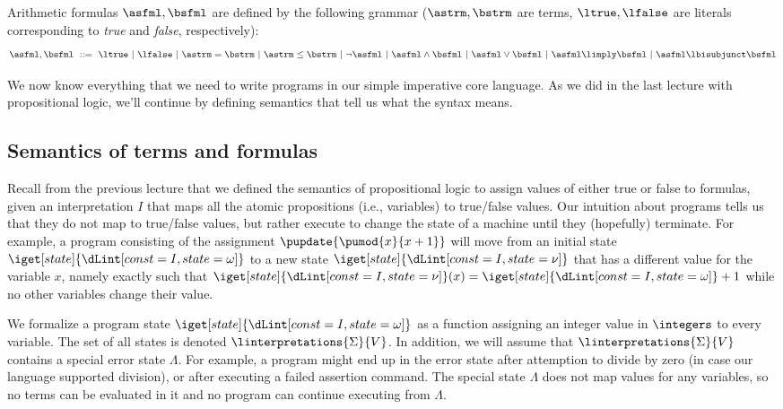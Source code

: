 \documentclass[11pt,twoside]{scrartcl}
\newcommand{\errstate}{\ensuremath{\Lambda}\xspace}
\begin{document}
\begin{definition}
\label{def:arith-syntax}
Arithmetic formulas $\asfml,\bsfml$ are defined by the following grammar ($\astrm,\bstrm$ are terms, $\ltrue,\lfalse$ are literals corresponding to \emph{true} and \emph{false}, respectively):
\[
  \asfml,\bsfml ~\bebecomes~
  \ltrue
  \alternative
  \lfalse
  \alternative
  \astrm = \bstrm
  \alternative
  \astrm \le \bstrm
  \alternative
  \lnot \asfml
  \alternative
  \asfml \land \bsfml
  \alternative
  \asfml \lor \bsfml  
  \alternative
  \asfml \limply \bsfml
  \alternative
  \asfml \lbisubjunct \bsfml    
\]
\end{definition}

We now know everything that we need to write programs in our simple imperative core language. As we did in the last lecture with propositional logic, we'll continue by defining semantics that tell us what the syntax means.

\subsection{Semantics of terms and formulas}

Recall from the previous lecture that we defined the semantics of propositional logic to assign values of either true or false to formulas, given an interpretation $I$ that maps all the atomic propositions (i.e., variables) to true/false values. Our intuition about programs tells us that they do not map to true/false values, but rather execute to change the state of a machine until they (hopefully) terminate. For example, a program consisting of the assignment \(\pupdate{\pumod{x}{x+1}}\) will move from an initial state $\iget[state]{\I}$ to a new state $\iget[state]{\It}$ that has a different value for the variable $x$, namely exactly such that \(\iget[state]{\It}(x)=\iget[state]{\I}+1\) while no other variables change their value.

We formalize a program state $\iget[state]{\I}$ as a function assigning an integer value in $\integers$ to every variable.
The set of all states is denoted \(\linterpretations{\Sigma}{V}\). In addition, we will assume that \(\linterpretations{\Sigma}{V}\) contains a special error state \errstate. For example, a program might end up in the error state after attemption to divide by zero (in case our language supported division), or after executing a failed assertion command. The special state \errstate does not map values for any variables, so no terms can be evaluated in it and no program can continue executing from \errstate.
\end{document}
